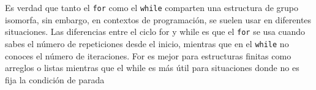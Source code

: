 \tab Es verdad que tanto el \texttt{for} como el \texttt{while} comparten una estructura de grupo isomorfa, sin embargo, en contextos de programación, se suelen usar en diferentes situaciones. Las diferencias entre el ciclo for y while es que el \texttt{for} se usa cuando sabes el número de repeticiones desde el inicio, mientras que en el \texttt{while} no conoces el número de iteraciones. For es mejor para estructuras finitas como arreglos o listas mientras que el while es más útil para situaciones donde no es fija la condición de parada